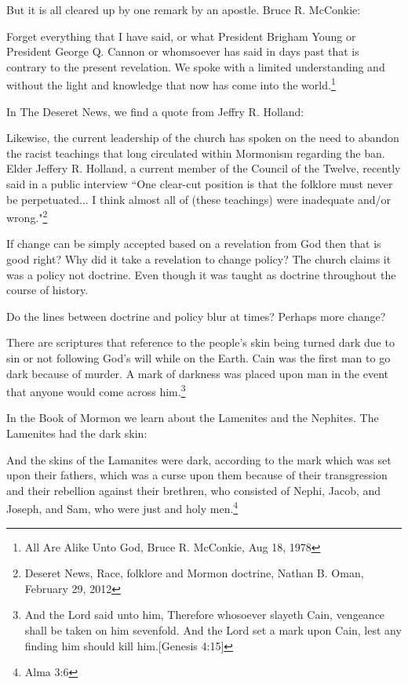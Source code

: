 \documentclass{article}
\begin{document}
But it is all cleared up by one remark by an apostle. Bruce R. McConkie:

\begin{displayquote}
Forget everything that I have said, or what President Brigham Young or 
President George Q. Cannon or whomsoever has said in days past that is contrary 
to the present revelation. We spoke with a limited understanding and without the 
light and knowledge that now has come into the world.\footnote{All Are Alike 
Unto God, Bruce R. McConkie, Aug 18, 1978}
\end{displayquote}

In The Deseret News, we find a quote from Jeffry R. Holland:

\begin{displayquote}
Likewise, the current leadership of the church has spoken on the need to 
abandon the racist teachings that long circulated within Mormonism 
regarding the ban. Elder Jeffery R. Holland, a current member of the 
Council of the Twelve, recently said in a public interview 
``One clear-cut position is that the folklore must never be perpetuated...
I think almost all of (these teachings) were inadequate and/or 
wrong."\footnote{Deseret News, Race, folklore and Mormon doctrine, 
Nathan B. Oman, February 29, 2012}
\end{displayquote}

If change can be simply accepted based on a revelation from God then that is 
good right? Why did it take a revelation to change policy? The church claims it 
was a policy not doctrine. Even though it was taught as doctrine throughout the 
course of history.

Do the lines between doctrine and policy blur at times? Perhaps more change?

There are scriptures that reference to the people's skin being turned dark due 
to sin or not following God's will while on the Earth. Cain was the first man to 
go dark because of murder. A mark of darkness was placed upon man in the event 
that anyone would come across him.\footnote{And the Lord said unto him, 
Therefore whosoever slayeth Cain, vengeance shall be taken on him sevenfold. 
And the Lord set a mark upon Cain, lest any finding him should kill 
him.[Genesis 4:15]}

In the Book of Mormon we learn about the Lamenites and the Nephites. The 
Lamenites had the dark skin:

\begin{displayquote}
And the skins of the Lamanites were dark, according to the mark which was set 
upon their fathers, which was a curse upon them because of their transgression 
and their rebellion against their brethren, who consisted of Nephi, Jacob, and 
Joseph, and Sam, who were just and holy men.\footnote{Alma 3:6}
\end{displayquote}
\end{document}
